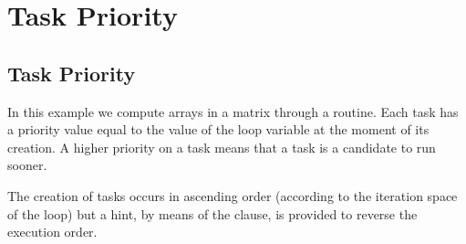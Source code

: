 \pagebreak
\chapter{Task Priority}
\label{chap:task_priority}



\section{Task Priority}
\label{section:task_priority}

In this example we compute arrays in a matrix through a  routine.
Each task has a priority value equal to the value of the loop variable  at the
moment of its creation. A higher priority on a task means that a task is a candidate
to run sooner.

The creation of tasks occurs in ascending order (according to the iteration space of
the loop) but a hint, by means of the  clause, is provided to reverse
the execution order.



